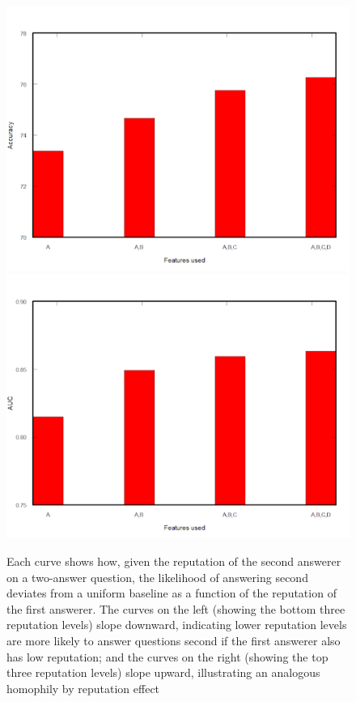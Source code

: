 \begin{figure}[!t]
    \centering
    \includegraphics[width=0.7\columnwidth]{img/Fig10_left.pdf}
    \includegraphics[width=0.7\columnwidth]{img/Fig10_right.pdf}
    \caption{Each curve shows how, given the reputation of the second answerer on a two-answer question, the likelihood of answering second deviates from a uniform baseline as a function of the reputation of the first answerer. The curves on the left (showing the bottom three reputation levels) slope downward, indicating lower reputation levels are more likely to answer questions second if the first answerer also has low reputation; and the curves on the right (showing the top three reputation levels) slope upward, illustrating an analogous homophily by reputation effect}
    \label{fig:fig10}
\end{figure}



